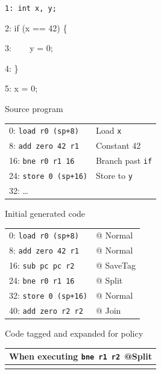 \documentclass{report}
\begin{document}
\begin{figure}
  \begin{subfigure}[t]{0.22\textwidth}
    \vspace{0em}
    {\tt 1: int x, y;

    2: if (x == 42) \{

    3: ~~~ y = 0;

    4: \}

    5: x = 0;
    }

    \caption{Source program}
    \label{ex:if0}
  \end{subfigure}
  \begin{subfigure}[t]{0.42\textwidth}
    \vspace{0em}
    \begin{tabular}{l l}
      0: {\tt load r0 (sp+8)} & Load {\tt x} \\
      8: {\tt add zero 42 r1} & Constant 42 \\
      16: {\tt bne r0 r1 16} & Branch past {\tt if} \\
      24: {\tt store 0 (sp+16)} & Store to {\tt y} \\
      32: \dots & \\
    \end{tabular}
    \caption{Initial generated code}
    \label{ex:if1}
  \end{subfigure}
  \begin{subfigure}[t]{0.4\textwidth}
     \vspace{0em}
     \begin{tabular}{l l}
      0: {\tt load r0 (sp+8)} & @ {\sc Normal} \\
      8: {\tt add zero 42 r1} & @ {\sc Normal} \\
      16: {\tt sub pc pc r2} & @ {\sc SaveTag} \\
      24: {\tt bne r0 r1 16} & @ {\sc Split} \\
      32: {\tt store 0 (sp+16)} & @ {\sc Normal} \\
      40: {\tt add zero r2 r2} & @ {\sc Join} \\
    \end{tabular}
    \caption{Code tagged and expanded for policy}
    \label{ex:if2}
  \end{subfigure}
  \begin{subfigure}{\textwidth}
    \begin{tabular}{|l|}
      \hline
      When executing {\tt bne r1 r2 }@{\sc Split} \\
      \hline
      \rowcolor{blue!30}

\end{tabular}
\end{subfigure}
\end{figure}
\end{document}
